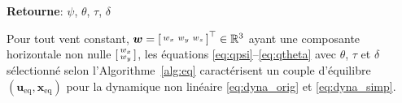 \begin{algorithm}
\begin{algorithmic}[1]
    \end{algorithmic}
    \hspace*{.1cm} \textbf{Retourne}:  $\psi$, $\theta$, $\tau$, $\delta$
    \end{algorithm}


    \begin{theorem}\label{thm:eqs}
    Pour tout vent constant, $\boldsymbol{w} =\left[ \begin{smallmatrix}w_x & w_y & w_z \end{smallmatrix} \right]^\top \in {\mathbb R}^3$ ayant une composante horizontale non nulle $\left[ \begin{smallmatrix}w_x \\ w_y \end{smallmatrix} \right]$,
    les équations \eqref{eq:qpsi}--\eqref{eq:qtheta} avec $\theta$, $\tau$ et $\delta$ sélectionné selon l'Algorithme~\ref{alg:eq} caractérisent un couple d'équilibre $(\boldsymbol{u}_{\text{eq}}, \boldsymbol{x}_{\text{eq}})$ pour la dynamique non linéaire \eqref{eq:dyna_orig} et \eqref{eq:dyna_simp}.
    
    \end{theorem}
    
